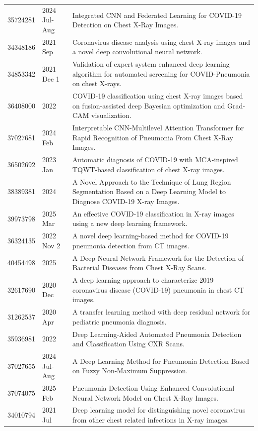 \begin{longtable}{llp{9.5cm}}
35724281 & 2024 Jul-Aug & Integrated CNN and Federated Learning for COVID-19 Detection on Chest X-Ray Images. \\
34348186 & 2021 Sep & Coronavirus disease analysis using chest X-ray images and a novel deep convolutional neural network. \\
34853342 & 2021 Dec 1 & Validation of expert system enhanced deep learning algorithm for automated screening for COVID-Pneumonia on chest X-rays. \\
36408000 & 2022 & COVID-19 classification using chest X-ray images based on fusion-assisted deep Bayesian optimization and Grad-CAM visualization. \\
37027681 & 2024 Feb & Interpretable CNN-Multilevel Attention Transformer for Rapid Recognition of Pneumonia From Chest X-Ray Images. \\
36502692 & 2023 Jan & Automatic diagnosis of COVID-19 with MCA-inspired TQWT-based classification of chest X-ray images. \\
38389381 & 2024 & A Novel Approach to the Technique of Lung Region Segmentation Based on a Deep Learning Model to Diagnose COVID-19 X-ray Images. \\
39973798 & 2025 Mar & An effective COVID-19 classification in X-ray images using a new deep learning framework. \\
36324135 & 2022 Nov 2 & A novel deep learning-based method for COVID-19 pneumonia detection from CT images. \\
40454498 & 2025 & A Deep Neural Network Framework for the Detection of Bacterial Diseases from Chest X-Ray Scans. \\
32617690 & 2020 Dec & A deep learning approach to characterize 2019 coronavirus disease (COVID-19) pneumonia in chest CT images. \\
31262537 & 2020 Apr & A transfer learning method with deep residual network for pediatric pneumonia diagnosis. \\
35936981 & 2022 & Deep Learning-Aided Automated Pneumonia Detection and Classification Using CXR Scans. \\
37027655 & 2024 Jul-Aug & A Deep Learning Method for Pneumonia Detection Based on Fuzzy Non-Maximum Suppression. \\
37074075 & 2025 Feb & Pneumonia Detection Using Enhanced Convolutional Neural Network Model on Chest X-Ray Images. \\
34010794 & 2021 Jul & Deep learning model for distinguishing novel coronavirus from other chest related infections in X-ray images. \\

\end{longtable}
